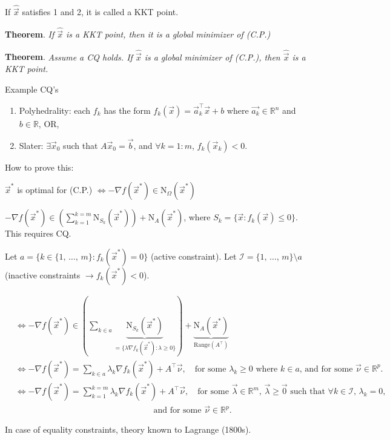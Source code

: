 \documentclass{article}
\newcommand{\R}{\mathbb{R}}
\begin{document}
If $\hat{\vec{x}}$ satisfies 1 and 2, it is called a KKT point.

\textbf{Theorem}. \textit{If $\hat{\vec{x}}$ is a KKT point, then it is a global minimizer of (C.P.)}

\textbf{Theorem}. \textit{Assume a CQ holds. If $\hat{\vec{x}}$ is a global minimizer of (C.P.), then $\hat{\vec{x}}$ is a KKT point.}

Example CQ's
\begin{enumerate}
    \item Polyhedrality: each $f_k$ has the form $f_k(\vec{x}) = \vec{a}_k^\top\vec{x} + b$ where $\vec{a_k} \in \R^n$ and $b \in \R$, OR,
    \item Slater: $\exists \vec{x}_0$ such that $A\vec{x}_0 = \vec{b}$, and $\forall k = 1:m$, $f_k(\vec{x}_k) < 0$.
\end{enumerate}
How to prove this:

$\vec{x}^*$ is optimal for (C.P.) $\iff -\nabla f(\vec{x}^*) \in \text{N}_{\Omega}(\vec{x}^*)$

$-\nabla f(\vec{x}^*) \in \left(\sum_{k = 1}^{k = m} \text{N}_{S_k}(\vec{x}^*)\right) + \text{N}_A(\vec{x}^*)$, where $S_k = \{\vec{x} : f_k(\vec{x}) \leq 0\}$. This requires CQ.

Let $a = \{k \in \{1,\, \ldots,\, m\} : f_k(\vec{x}^*) = 0\}$ (active constraint). Let $\mathcal{I} = \{1,\, \ldots,\, m\} \setminus a$ (inactive constraints $\rightarrow f_k(\vec{x}^*) < 0$).

\begin{align*}
    &\iff -\nabla f(\vec{x}^*) \in \left(\sum_{k \in a} \underbrace{\text{N}_{S_k}(\vec{x}^*)}_{= \{\lambda\nabla f_k(\vec{x}^*) : \lambda \geq 0\}}\right) + \underbrace{\text{N}_A(\vec{x}^*)}_{\text{Range}\left(A^\top\right)} \\
    &\iff -\nabla f(\vec{x}^*) = \sum_{k \in a} \lambda_k \nabla f_k(\vec{x}^*) + A^\top\vec{\nu}, \quad \text{for some } \lambda_k \geq 0 \text{ where } k \in a \text{, and for some } \vec{\nu} \in \R^p. \\
    &\iff -\nabla f(\vec{x}^*) = \sum_{k = 1}^{k = m} \lambda_k \nabla f_k(\vec{x}^*) + A^\top\vec{\nu}, \quad \text{for some } \vec{\lambda} \in \R^m,\, \vec{\lambda} \geq \vec{0} \text{ such that } \forall k \in \mathcal{I},\, \lambda_k = 0, \\
    &\hspace{196pt} \text{and for some } \vec{\nu} \in \R^p.
\end{align*}

In case of equality constraints, theory known to Lagrange (1800s).
\end{document}

